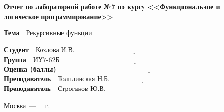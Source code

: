 \begin{titlepage}
	
	\begin{center}
		\Large\textbf{Отчет по лабораторной работе №7}
		\Large\textbf{по курсу <<Функциональное и логическое программирование>>}
	\end{center}


	\noindent\textbf{Тема} $\underline{\text{~~Рекурсивные функции~~~~~~~~~~~~~~~~~~~~~~~~~~}}$\newline\newline\newline


	\noindent\textbf{Студент} $\underline{\text{~~Козлова И.В.~~~~~~~~~~~~~~~~~~~~~~~~~~~~~~~~~~~~~~~~~~~~~~~~~~~~~~~~~~~~~~~~~~~~~~~~}}$\newline\newline
	\noindent\textbf{Группа} $\underline{\text{~~ИУ7-62Б~~~~~~~~~~~~~~~~~~~~~~~~~~~~~~~~~~~~~~~~~~~~~~~~~~~~~~~~~~~~~~~~~~~~~~~~~~~~~~~~}}$\newline\newline
	\noindent\textbf{Оценка (баллы)} $\underline{\text{~~~~~~~~~~~~~~~~~~~~~~~~~~~~~~~~~~~~~~~~~~~~~~~~~~~~~~~~~~~~~~~~~~~~~~~~~~~~~~~~}}$\newline\newline
	\noindent\textbf{Преподаватель} $\underline{\text{~~Толплинская Н.Б.~~~~~~~~~~~~~~~~~~~~~~~~~~~~~~~~~~~~~~~~~~~~~~~~~~~~~~}}$\newline\newline
	\noindent\textbf{Преподаватель} $\underline{\text{~~Строганов Ю.В.~~~~~~~~~~~~~~~~~~~~~~~~~~~~~~~~~~~~~~~~~~~~~~~~~~~~~~~~~~}}$\newline
	
	\begin{center}
		\vfill
		Москва~---~\the\year
		~г.
	\end{center}
	\restoregeometry
\end{titlepage}

